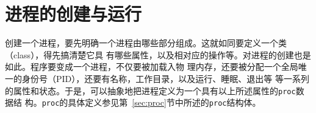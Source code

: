 \documentclass{swfcthesismscctex}
\begin{document}


\section{进程的创建与运行}
\label{sec:proc-creation}

创建一个进程，要先明确一个进程由哪些部分组成。这就如同要定义一个类（class），得先搞清楚它具
有哪些属性，以及相对应的操作等。对进程的创建也是如此。程序要变成一个进程，不仅要被加载入物
理内存，还要被分配一个全局唯一的身份号（PID），还要有名称，工作目录，以及运行、睡眠、退出等
等一系列的属性和状态。于是，可以抽象地把进程定义为一个具有以上所述属性的\texttt{proc}数据结
构。\texttt{proc}的具体定义参见第~\ref{sec:proc}节中所述的\texttt{proc}结构体。
\end{document}
